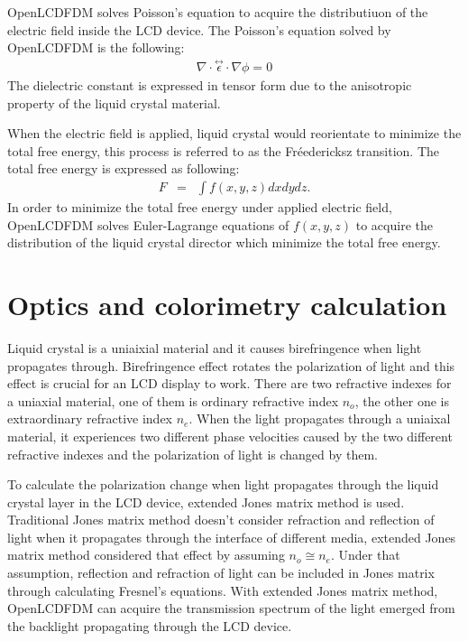 \documentclass[11pt, a4paper]{article} %
\begin{document}
\begin{multicols}{2}
OpenLCDFDM solves Poisson's equation to acquire the distributiuon of the electric field inside the LCD device. The Poisson's equation solved by OpenLCDFDM is the following: 
\begin{eqnarray}
\nabla\cdot\stackrel{\leftrightarrow}{\epsilon}\cdot\nabla\phi = 0
\label{eq:Poisson_anisotropiv}
\end{eqnarray}
The dielectric constant is expressed in tensor form due to the anisotropic property of the liquid crystal material.

When the electric field is applied, liquid crystal would reorientate to minimize the total free energy, this process is referred to as the Fréedericksz transition.
The total free energy is expressed as following:
\begin{eqnarray}
F&=&\int f(x,y,z) dxdydz.
\label{eq:total_free_energy}
\end{eqnarray}
In order to minimize the total free energy under applied electric field, OpenLCDFDM solves Euler-Lagrange equations of $f(x,y,z)$ to acquire the distribution of the liquid crystal director which minimize the total free energy.

\section{Optics and colorimetry calculation}
Liquid crystal is a uniaixial material and it causes birefringence when light propagates through. Birefringence effect rotates the polarization of light and this effect is crucial for an LCD display to work. There are two refractive indexes for a uniaxial material, one of them is ordinary refractive index $n_o$, the other one is extraordinary refractive index $n_e$. When the light propagates through a uniaixal material, it experiences two different phase velocities caused by the two different refractive indexes and the polarization of light is changed by them.

To calculate the polarization change when light propagates through the liquid crystal layer in the LCD device, extended Jones matrix method\cite{POCHIYEH} is used.
Traditional Jones matrix method doesn't consider refraction and reflection of light when it propagates through the interface of different media, extended Jones matrix method considered that effect by assuming $n_o \cong n_e$. Under that assumption, reflection and refraction of light can be included in Jones matrix through calculating Fresnel's equations. With extended Jones matrix method, OpenLCDFDM can acquire the transmission spectrum of the light emerged from the backlight propagating through the LCD device.


\end{multicols}
\end{document}
